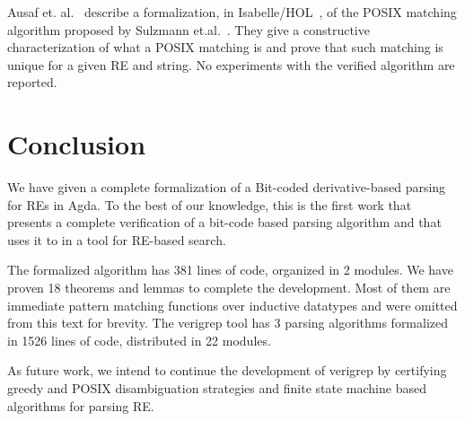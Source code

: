 \documentclass[sigplan, anonymous, review]{acmart}
\theoremstyle{definition}
\begin{document}
Ausaf et. al.~\cite{AusafDU16} describe a formalization, in
Isabelle/HOL~\cite{Nipkow02}, of the POSIX matching algorithm proposed
by Sulzmann et.al.~\cite{SulzmannL14}. They give a constructive
characterization of what a POSIX matching is and prove that such
matching is unique for a given RE and string. No experiments with the
verified algorithm are reported.


\section{Conclusion}\label{sec:conclusion}

We have given a complete formalization of a Bit-coded derivative-based 
parsing for REs in Agda. To the best of our knowledge, this is the first work
that presents a complete verification of a bit-code based parsing algorithm 
and that uses it to in a tool for RE-based search.

The formalized algorithm has 381 lines of code, organized in 2
modules. We have proven 18 theorems and lemmas to complete the
development. Most of them are immediate pattern matching functions
over inductive datatypes and were omitted from this text for brevity.
The verigrep tool has 3 parsing algorithms formalized in 1526 lines of code, 
distributed in 22 modules.

As future work, we intend to continue the development of verigrep by
certifying greedy and POSIX disambiguation strategies and finite state machine
based algorithms for parsing RE.



\end{document}
